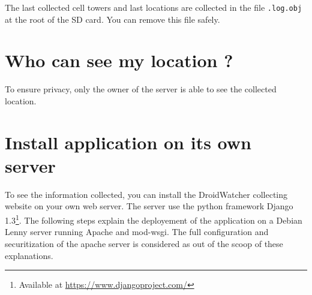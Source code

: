 The last collected cell towers and last locations are collected in the file \texttt{.log.obj} at the root of the SD card. You can remove this file safely.

\section{Who can see my location ?}

To ensure privacy, only the owner of the server is able to see the collected location.

\section{Install application on its own server}

To see the information collected, you can install the DroidWatcher collecting website on your own web server.
The server use the python framework Django 1.3\footnote{Available at \url{https://www.djangoproject.com/}}.
The following steps explain the deployement of the application on a Debian Lenny server running Apache and mod-wsgi. The full configuration and securitization of the apache server is considered as out of the scoop of these explanations.

